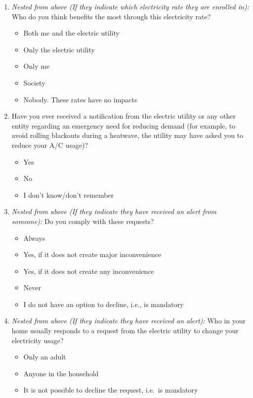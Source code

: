 \documentclass{article}
\begin{document}
\begin{enumerate}
\item \textit{Nested from above (If they indicate which electricity rate they are enrolled in):}
Who do you think benefits the most through this electricity rate?
\begin{itemize}
  \item[\checkbox] Both me and the electric utility
  \item[\checkbox] Only the electric utility
  \item[\checkbox] Only me
  \item[\checkbox] Society
  \item[\checkbox] Nobody. These rates have no impacts
\end{itemize}
 

\item Have you ever received a notification from the electric utility or any other entity regarding an emergency need for reducing demand (for example, to avoid rolling blackouts during a heatwave, the utility may have asked you to reduce your A/C usage)?
\begin{itemize}
  \item[\checkbox] Yes
  \item[\checkbox] No
  \item[\checkbox] I don't know/don't remember
\end{itemize}
 

\item \textit{Nested from above (If they indicate they have received an alert from someone):}
Do you comply with these requests?
\begin{itemize}
  \item[\checkbox] Always
  \item[\checkbox] Yes, if it does not create major inconvenience
  \item[\checkbox] Yes, if it does not create any inconvenience
  \item[\checkbox] Never
  \item[\checkbox] I do not have an option to decline, i.e., is mandatory
\end{itemize}
 

\item \textit{Nested from above (If they indicate they have received an alert):}
Who in your home usually responds to a request from the electric utility to change your electricity usage?
\begin{itemize}
  \item[\checkbox] Only an adult
  \item[\checkbox] Anyone in the household
  \item[\checkbox] It is not possible to decline the request, i.e.\ is mandatory
\end{itemize}
 


\end{enumerate}
\end{document}
